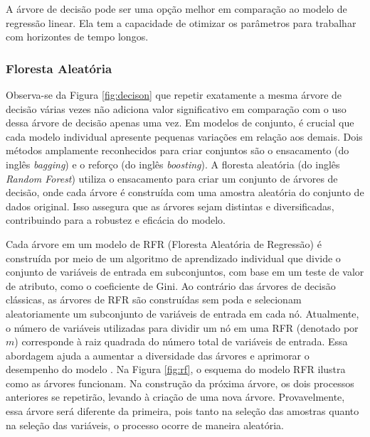 %	
%

A árvore de decisão pode ser uma opção melhor em comparação ao modelo de regressão linear. Ela tem a capacidade de otimizar os parâmetros para trabalhar com horizontes de tempo longos.

\subsubsection{Floresta Aleat\'oria } \label{subsubsec:rf}

Observa-se da Figura \ref{fig:decison} que repetir exatamente a mesma árvore de decisão várias vezes não adiciona valor significativo em comparação com o uso dessa árvore de decisão apenas uma vez. Em modelos de conjunto, é crucial que cada modelo individual apresente pequenas variações em relação aos demais. Dois métodos amplamente reconhecidos para criar conjuntos são o ensacamento (do inglês \textit{bagging}) e o reforço (do inglês \textit{boosting}). A floresta aleatória (do inglês \textit{Random Forest}) utiliza o ensacamento para criar um conjunto de árvores de decisão, onde cada árvore é construída com uma amostra aleatória do conjunto de dados original. Isso assegura que as árvores sejam distintas e diversificadas, contribuindo para a robustez e eficácia do modelo.

Cada árvore em um modelo de RFR (Floresta Aleatória de Regressão)  é construída por meio de um algoritmo de aprendizado individual que divide o conjunto de variáveis de entrada em subconjuntos, com base em um teste de valor de atributo, como o coeficiente de Gini. Ao contrário das árvores de decisão clássicas, as árvores de RFR são construídas sem poda e selecionam aleatoriamente um subconjunto de variáveis de entrada em cada nó. Atualmente, o número de variáveis utilizadas para dividir um nó em uma RFR (denotado por $m$) corresponde à raiz quadrada do número total de variáveis de entrada. Essa abordagem ajuda a aumentar a diversidade das árvores e aprimorar o desempenho do modelo \cite{Pelletier2016156}. Na Figura \ref{fig:rf}, o esquema do modelo RFR ilustra como as árvores funcionam.
Na construção da próxima árvore, os dois processos anteriores se repetirão, levando à criação de uma nova árvore. Provavelmente, essa árvore será diferente da primeira, pois tanto na seleção das amostras quanto na seleção das variáveis, o processo ocorre de maneira aleatória.

